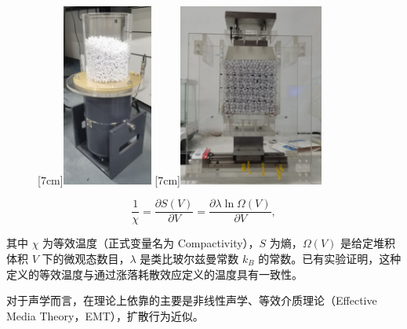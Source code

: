 \begin{figure}[!hbtp]
  \centering
                [7cm]{\includegraphics[height=6cm]{figures/1_tapping.jpg}}
  \hspace{1cm}
                [7cm]{\includegraphics[height=6cm]{figures/1_shearing.jpg}}
  \label{fig:apparatus_of_granular}
\end{figure}

\begin{equation}
  \frac{1}{\chi} = \frac{\partial S(V)}{\partial V} = \frac{\partial \lambda\ln{\Omega(V)}}{\partial V},
\end{equation}

其中 $\chi$ 为等效温度（正式变量名为 Compactivity），$S$ 为熵，$\Omega(V)$ 是给定堆积体积 $V$ 下的微观态数目，$\lambda$ 是类比玻尔兹曼常数 $k_{B}$ 的常数。已有实验证明，这种定义的等效温度与通过涨落耗散效应定义的温度具有一致性\cite{PhysRevLett.129.228004}。

对于声学而言，在理论上依靠的主要是非线性声学\cite{10.1029/93JB02974}、等效介质理论（Effective Media Theory，EMT）\cite{WALTON1987213}，扩散行为近似。


